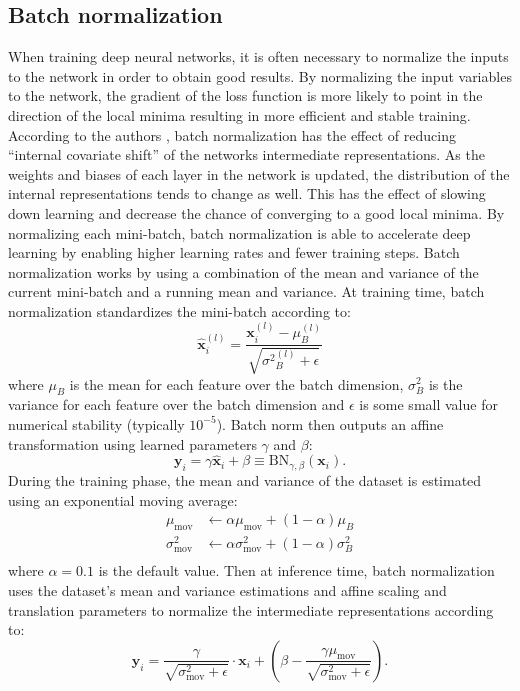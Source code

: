 \documentclass[a4paper,11pt]{article}
\begin{document}
\subsection{Batch normalization}
When training deep neural networks, it is often necessary to normalize the inputs to the network in order to obtain good results. By normalizing the input variables to the network, the gradient of the loss function is more likely to point in the direction of the local minima resulting in more efficient and stable training. According to the authors \cite{ioffe2015batch}, batch normalization has the effect of reducing ``internal covariate shift'' of the networks intermediate representations. As the weights and biases of each layer in the network is updated, the distribution of the internal representations tends to change as well. This has the effect of slowing down learning and decrease the chance of converging to a good local minima. By normalizing each mini-batch, batch normalization is able to accelerate deep learning by enabling higher learning rates and fewer training steps. Batch normalization works by using a combination of the mean and variance of the current mini-batch and a running mean and variance. At training time, batch normalization standardizes the mini-batch according to:
\begin{equation}
  \hat{\mathbf{x}}_{i}^{(l)} = \frac{\mathbf{x}^{(l)}_{i}-\mu^{(l)}_{B}}{\sqrt{{\sigma^{2}}^{(l)}_{B}+\epsilon}}
\end{equation}
where $\mu_{B}$ is the mean for each feature over the batch dimension, $\sigma_{B}^{2}$ is the variance for each feature over the batch dimension and $\epsilon$ is some small value for numerical stability (typically $10^{-5}$). Batch norm then outputs an affine transformation using learned parameters $\gamma$ and $\beta$:
\begin{equation}
  \mathbf{y}_{i} = \gamma \hat{\mathbf{x}}_{i}+\beta \equiv \mathrm{BN}_{\gamma, \beta}\left(\mathbf{x}_{i}\right).
\end{equation}
During the training phase, the mean and variance of the dataset is estimated using an exponential moving average:
\begin{equation}
  \begin{split}
    \mu_\text{mov} &\leftarrow \alpha \mu_\text{mov} + (1 - \alpha)\mu_{B} \\
    \sigma^2_\text{mov} &\leftarrow \alpha \sigma^2_\text{mov} + (1 - \alpha)\sigma^2_{B} \\
  \end{split}
\end{equation}
where $\alpha=0.1$ is the default value. Then at inference time, batch normalization uses the dataset's mean and variance estimations and affine scaling and translation parameters to normalize the intermediate representations according to:
\begin{equation} \label{eq:batch-norm}
  \mathbf{y}_i = \frac{\gamma}{\sqrt{\sigma^{2}_\text{mov} +\epsilon}} \cdot \mathbf{x}_i +\left(\beta - \frac{\gamma \mu_\text{mov}}{\sqrt{\sigma^{2}_\text{mov}+\epsilon}}\right).
\end{equation}
\end{document}
